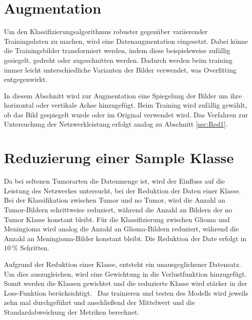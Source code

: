 \section{Augmentation}

Um den Klassifizierungsalgorithmus robuster gegenüber variierender Trainingsdaten zu machen, wird eine Datenaugmentation eingesetzt.
Dabei könne die Trainingsbilder transformiert werden, indem diese beispielsweise zufällig gesiegelt, gedreht oder zugeschnitten werden. 
Dadurch werden beim training immer leicht unterschiedliche Varianten der Bilder verwendet, was Overfitting entgegenwirkt.~\cite{Yamashita2018}

In diesem Abschnitt wird zur Augmentation eine Spiegelung der Bilder um ihre horizontal oder vertikale Achse hinzugefügt.
Beim Training wird zufällig gewählt, ob das Bild gespiegelt wurde oder im Original verwendet wird.
Das Verfahren zur Untersuchung der Netzwerkleistung erfolgt analog zu Abschnitt \ref{sec:Red1}.    

\section{Reduzierung einer Sample Klasse}

Da bei seltenen Tumorarten die Datenmenge ist, wird der Einfluss auf die Leistung des Netzwerkes untersucht, 
bei der Reduktion der Daten einer Klasse.
Bei der Klassifikation zwischen Tumor und no Tumor, wird die Anzahl an Tumor-Bildern schrittweise reduziert, 
während die Anzahl an Bildern der no Tumor Klasse konstant bleibt.
Für die Klassifizierung zwischen Glioma und Meningioma wird analog die Anzahl an Glioma-Bildern reduziert, während die Anzahl an Meningioma-Bilder konstant bleibt.
Die Reduktion der Date erfolgt in $\qty{10}{\%}$ Schritten. 

Aufgrund der Reduktion einer Klasse, entsteht ein unausgeglichener Datensatz.
Um dies auszugleichen, wird eine Gewichtung in die Verlustfunktion hinzugefügt.
Somit werden die Klassen gewichtet und die reduzierte Klasse wird stärker in der Loss-Funktion berücksichtigt.~\cite{pytorchCrossEntropy}
Das trainieren und testen des Modells wird jeweils zehn mal durchgeführt und anschließend der Mittelwert und die Standardabweichung der
Metriken berechnet.


